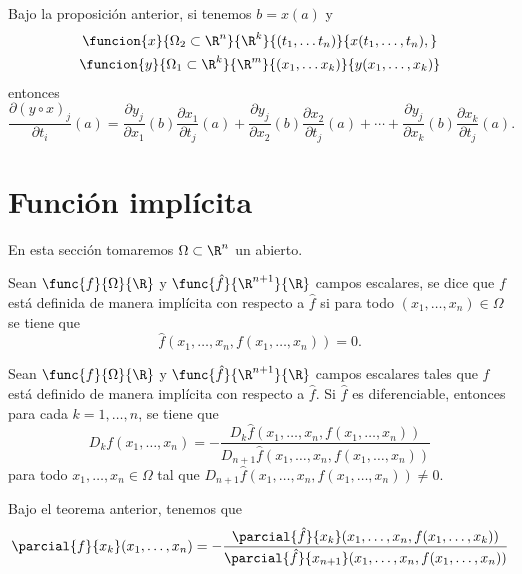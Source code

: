 \documentclass[a4,11pt]{aleph-notas}
\begin{document}
\begin{advertencia}
    Bajo la proposición anterior, si tenemos $b=x(a)$ y 
    \begin{gather*}
        \funcion{x}{\Omega_2\subset \R^n}{\R^k}{(t_1,\ldots t_n)}{x(t_1,\ldots, t_n),}\\
        \funcion{y}{\Omega_1\subset \R^k}{\R^m}{(x_1,\ldots x_k)}{y(x_1,\ldots, x_k)}
    \end{gather*}
    entonces
    \[
        \frac{\partial (y\circ x)_j}{\partial t_i}(a) 
            = \frac{\partial y_j}{\partial x_1} (b) \frac{\partial x_1}{\partial t_j}(a)
            + \frac{\partial y_j}{\partial x_2} (b) \frac{\partial x_2}{\partial t_j}(a)
            + \cdots 
            + \frac{\partial y_j}{\partial x_k} (b) \frac{\partial x_k}{\partial t_j}(a).
    \]
    
\end{advertencia}


\section{Función implícita}

En esta sección tomaremos $\Omega\subset\R^n$ un abierto.

\begin{defi}
    Sean $\func{f}{\Omega}{\R}$ y $\func{\hat{f}}{\R^{n+1}}{\R}$ campos escalares, se dice que $f$ está definida de manera implícita con respecto a $\hat{f}$ si para todo $(x_1,\ldots,x_n)\in \Omega$ se tiene que
    \[
        \hat{f}(x_1,\ldots,x_n,f(x_1,\ldots,x_n))=0.
    \]
\end{defi}

\begin{teo}
    Sean $\func{f}{\Omega}{\R}$ y $\func{\hat{f}}{\R^{n+1}}{\R}$ campos escalares tales que $f$ está definido de manera implícita con respecto a $\hat{f}$. Si $\hat{f}$ es diferenciable, entonces para cada $k=1,\ldots, n$, se tiene que
    \[
        D_k f (x_1,\ldots,x_n) = 
        -\frac{D_k \hat{f}(x_1,\ldots,x_n,f(x_1,\ldots,x_n))}{D_{n+1} \hat{f}(x_1,\ldots,x_n,f(x_1,\ldots,x_n))}
    \]
    para todo $x_1,\ldots,x_n\in \Omega$ tal que $D_{n+1} \hat{f}(x_1,\ldots,x_n,f(x_1,\ldots,x_n))\neq 0$.
\end{teo}

\begin{advertencia}
    Bajo el teorema anterior, tenemos que
    \[
        \parcial{f}{x_k}(x_1,\ldots,x_n)= -\frac{\parcial{\hat{f}}{x_k}(x_1,\ldots,x_n,f(x_1,\ldots,x_k))}{\parcial{\hat{f}}{x_{n+1}}(x_1,\ldots,x_n,f(x_1,\ldots,x_n))}
    \]
\end{advertencia}
\end{document}
